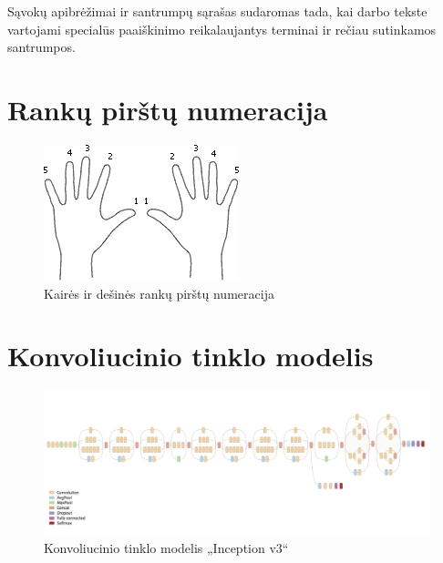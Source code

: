 \documentclass{VUMIFPSbakalaurinis}
\begin{document}
Sąvokų apibrėžimai ir santrumpų sąrašas sudaromas tada, kai darbo tekste
vartojami specialūs paaiškinimo reikalaujantys terminai ir rečiau sutinkamos
santrumpos.

\appendix  %

\section{Rankų pirštų numeracija}
\label{appendix:pirstai}
\begin{figure}[H]
    \centering
    \includegraphics[scale=1]{img/fingers}
    \caption{Kairės ir dešinės rankų pirštų numeracija}
    \label{img:fingers}
\end{figure}

\section{Konvoliucinio tinklo modelis}
\label{appendix:inception_v3}
\begin{figure}[H]
	\centering
	\includegraphics[scale=0.2]{img/inception_v3}
	\caption{Konvoliucinio tinklo modelis „Inception v3“}
	\label{img:inception_v3}
\end{figure}

\end{document}
